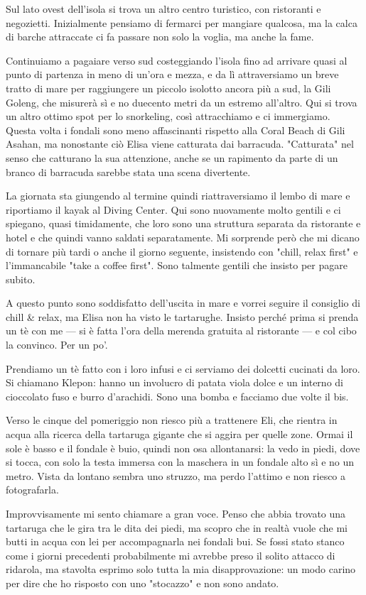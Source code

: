 Sul lato ovest dell'isola si trova un altro centro turistico, con ristoranti e negozietti. Inizialmente pensiamo di fermarci per mangiare qualcosa, ma la calca di barche attraccate ci fa passare non solo la voglia, ma anche la fame.

Continuiamo a pagaiare verso sud costeggiando l'isola fino ad arrivare quasi al punto di partenza in meno di un'ora e mezza, e da lì attraversiamo un breve tratto di mare per raggiungere un piccolo isolotto ancora più a sud, la Gili Goleng, che misurerà sì e no duecento metri da un estremo all'altro. Qui si trova un altro ottimo spot per lo snorkeling, così attracchiamo e ci immergiamo. Questa volta i fondali sono meno affascinanti rispetto alla Coral Beach di Gili Asahan, ma nonostante ciò Elisa viene catturata dai barracuda. "Catturata" nel senso che catturano la sua attenzione, anche se un rapimento da parte di un branco di barracuda sarebbe stata una scena divertente.

La giornata sta giungendo al termine quindi riattraversiamo il lembo di mare e riportiamo il kayak al Diving Center. Qui sono nuovamente molto gentili e ci spiegano, quasi timidamente, che loro sono una struttura separata da ristorante e hotel e che quindi vanno saldati separatamente. Mi sorprende però che mi dicano di tornare più tardi o anche il giorno seguente, insistendo con "chill, relax first" e l'immancabile "take a coffee first". Sono talmente gentili che insisto per pagare subito.

A questo punto sono soddisfatto dell'uscita in mare e vorrei seguire il consiglio di chill \& relax, ma Elisa non ha visto le tartarughe. Insisto perché prima si prenda un tè con me — si è fatta l'ora della merenda gratuita al ristorante — e col cibo la convinco. Per un po'.

Prendiamo un tè fatto con i loro infusi e ci serviamo dei dolcetti cucinati da loro. Si chiamano Klepon: hanno un involucro di patata viola dolce e un interno di cioccolato fuso e burro d'arachidi. Sono una bomba e facciamo due volte il bis.

Verso le cinque del pomeriggio non riesco più a trattenere Eli, che rientra in acqua alla ricerca della tartaruga gigante che si aggira per quelle zone. Ormai il sole è basso e il fondale è buio, quindi non osa allontanarsi: la vedo in piedi, dove si tocca, con solo la testa immersa con la maschera in un fondale alto sì e no un metro. Vista da lontano sembra uno struzzo, ma perdo l'attimo e non riesco a fotografarla.

Improvvisamente mi sento chiamare a gran voce. Penso che abbia trovato una tartaruga che le gira tra le dita dei piedi, ma scopro che in realtà vuole che mi butti in acqua con lei per accompagnarla nei fondali bui. Se fossi stato stanco come i giorni precedenti probabilmente mi avrebbe preso il solito attacco di ridarola, ma stavolta esprimo solo tutta la mia disapprovazione: un modo carino per dire che ho risposto con uno "stocazzo" e non sono andato.

